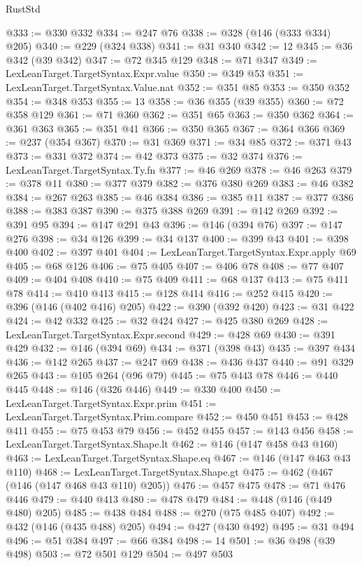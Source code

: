 \begin{lexlean}{RustStd}
\begin{coremodule}
@333 := @330 @332
@334 := @247 @76
@338 := @328 (@146 (@333 @334) @205)
@340 := @229 (@324 @338)
@341 := @31 @340
@342 := 12
@345 := @36 @342 (@39 @342)
@347 := @72 @345 @129
@348 := @71 @347
@349 := LexLeanTarget.TargetSyntax.Expr.value
@350 := @349 @53
@351 := LexLeanTarget.TargetSyntax.Value.nat
@352 := @351 @85
@353 := @350 @352
@354 := @348 @353
@355 := 13
@358 := @36 @355 (@39 @355)
@360 := @72 @358 @129
@361 := @71 @360
@362 := @351 @65
@363 := @350 @362
@364 := @361 @363
@365 := @351 @41
@366 := @350 @365
@367 := @364 @366
@369 := @237 (@354 @367)
@370 := @31 @369
@371 := @34 @85
@372 := @371 @43
@373 := @331 @372
@374 := @42 @373
@375 := @32 @374
@376 := LexLeanTarget.TargetSyntax.Ty.fn
@377 := @46 @269
@378 := @46 @263
@379 := @378 @11
@380 := @377 @379
@382 := @376 @380 @269
@383 := @46 @382
@384 := @267 @263
@385 := @46 @384
@386 := @385 @11
@387 := @377 @386
@388 := @383 @387
@390 := @375 @388 @269
@391 := @142 @269
@392 := @391 @95
@394 := @147 @291 @43
@396 := @146 (@394 @76)
@397 := @147 @276
@398 := @34 @126
@399 := @34 @137
@400 := @399 @43
@401 := @398 @400
@402 := @397 @401
@404 := LexLeanTarget.TargetSyntax.Expr.apply @69
@405 := @68 @126
@406 := @75 @405
@407 := @406 @78
@408 := @77 @407
@409 := @404 @408
@410 := @75 @409
@411 := @68 @137
@413 := @75 @411 @78
@414 := @410 @413
@415 := @128 @414
@416 := @252 @415
@420 := @396 (@146 (@402 @416) @205)
@422 := @390 (@392 @420)
@423 := @31 @422
@424 := @42 @332
@425 := @32 @424
@427 := @425 @380 @269
@428 := LexLeanTarget.TargetSyntax.Expr.second
@429 := @428 @69
@430 := @391 @429
@432 := @146 (@394 @69)
@434 := @371 (@398 @43)
@435 := @397 @434
@436 := @142 @265
@437 := @247 @69
@438 := @436 @437
@440 := @91 @329 @265
@443 := @105 @264 (@96 @79)
@445 := @75 @443 @78
@446 := @440 @445
@448 := @146 (@326 @446)
@449 := @330 @400
@450 := LexLeanTarget.TargetSyntax.Expr.prim
@451 := LexLeanTarget.TargetSyntax.Prim.compare
@452 := @450 @451
@453 := @428 @411
@455 := @75 @453 @79
@456 := @452 @455
@457 := @143 @456
@458 := LexLeanTarget.TargetSyntax.Shape.lt
@462 := @146 (@147 @458 @43 @160)
@463 := LexLeanTarget.TargetSyntax.Shape.eq
@467 := @146 (@147 @463 @43 @110)
@468 := LexLeanTarget.TargetSyntax.Shape.gt
@475 := @462 (@467 (@146 (@147 @468 @43 @110) @205))
@476 := @457 @475
@478 := @71 @476 @446
@479 := @440 @413
@480 := @478 @479
@484 := @448 (@146 (@449 @480) @205)
@485 := @438 @484
@488 := @270 (@75 @485 @407)
@492 := @432 (@146 (@435 @488) @205)
@494 := @427 (@430 @492)
@495 := @31 @494
@496 := @51 @384
@497 := @66 @384
@498 := 14
@501 := @36 @498 (@39 @498)
@503 := @72 @501 @129
@504 := @497 @503

\end{coremodule}
\end{lexlean}
